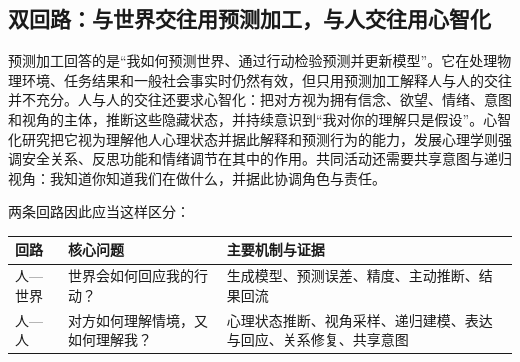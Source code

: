\documentclass[UTF8,a4paper,11pt]{ctexart}
\begin{document}
\subsection{双回路：与世界交往用预测加工，与人交往用心智化}

预测加工回答的是“我如何预测世界、通过行动检验预测并更新模型”。它在处理物理环境、任务结果和一般社会事实时仍然有效，但只用预测加工解释人与人的交往并不充分。人与人的交往还要求心智化：把对方视为拥有信念、欲望、情绪、意图和视角的主体，推断这些隐藏状态，并持续意识到“我对你的理解只是假设”。心智化研究把它视为理解他人心理状态并据此解释和预测行为的能力\cite{Frith2006}，发展心理学则强调安全关系、反思功能和情绪调节在其中的作用\cite{Fonagy2002}。共同活动还需要共享意图与递归视角：我知道你知道我们在做什么，并据此协调角色与责任\cite{Tomasello2005}。

两条回路因此应当这样区分：

\begin{center}
\begin{longtable}{@{}p{2.8cm}p{4.8cm}p{5.4cm}@{}}
\toprule
\textbf{回路} & \textbf{核心问题} & \textbf{主要机制与证据} \\
\midrule
人—世界 & 世界会如何回应我的行动？ & 生成模型、预测误差、精度、主动推断、结果回流 \\
人—人 & 对方如何理解情境，又如何理解我？ & 心理状态推断、视角采样、递归建模、表达与回应、关系修复、共享意图 \\
\bottomrule
\end{longtable}
\end{center}
\end{document}
